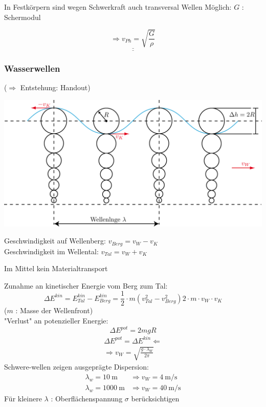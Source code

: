 In Festkörpern sind wegen Schwerkraft auch transversal Wellen Möglich: \hspace{2cm} $ G $ : Schermodul

$$ \underline{\underline{\Rightarrow v_{Ph} = \sqrt{\frac{G}{\rho}}}} $$

\subsubsection{Wasserwellen}
\enter
($ \Rightarrow $ Entstehung: Handout)
\begin{center}
	\includegraphics[width=0.7\linewidth]{skizzen/19/19B26}
\end{center}
Geschwindigkeit auf Wellenberg: $ v_{Berg} = v_W - v_K$\\
Geschwindigkeit im Wellental: $ v_{Tal} = v_{W} + v_{K} $\\
\begin{tcolorbox}[width=\textwidth*3/5,colback={White}]
Im Mittel kein Materialtransport
\end{tcolorbox}
Zunahme an kinetischer Energie vom Berg zum Tal:
$$ \Delta E^{kin} = E_{Tal}^{kin} - E_{Berg}^{kin} = \frac{1}{2} \cdot m (v_{Tal}^2 - v_{Berg}^2) 2 \cdot m \cdot v_{W} \cdot v_{K}$$
($ m $ : Masse der Wellenfront)\\
"Verlust" an potenzieller Energie:
$$ \Delta E ^{pot} = 2mgR $$
\begin{align*}
\Delta E^{pot}  = \Delta E ^{kin} \Leftarrow\\
\Rightarrow v_W = \sqrt{\frac{g\cdot\lambda_W}{2\pi}}
\end{align*}
Schwere-wellen zeigen ausgeprägte Dispersion:
\begin{align*}
\lambda_w = \SI{10}{\meter} &\Rightarrow v_W = \SI{4}{\meter\per\second}\\
\lambda_w = \SI{1000}{\meter} &\Rightarrow v_W = \SI{40}{\meter\per\second}
\end{align*}
Für kleinere $ \lambda $ : Oberflächenspannung $ \sigma $ berücksichtigen\\

